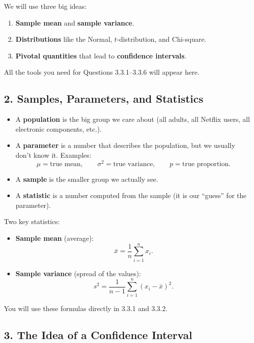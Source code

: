 \documentclass[11pt,letterpaper]{article}
\theoremstyle{remark}
\begin{document}
We will use three big ideas:
\begin{enumerate}
    \item \textbf{Sample mean} and \textbf{sample variance}.
    \item \textbf{Distributions} like the Normal, $t$-distribution, and Chi-square.
    \item \textbf{Pivotal quantities} that lead to \textbf{confidence intervals}.
\end{enumerate}

All the tools you need for Questions 3.3.1--3.3.6 will appear here.

\subsection*{2. Samples, Parameters, and Statistics}

\begin{itemize}
    \item A \textbf{population} is the big group we care about (all adults, all Netflix users, all electronic components, etc.).
    \item A \textbf{parameter} is a number that describes the population, but we usually don't know it. Examples:
    \[
    \mu = \text{true mean}, \qquad \sigma^2 = \text{true variance}, \qquad p = \text{true proportion}.
    \]
    \item A \textbf{sample} is the smaller group we actually see.
    \item A \textbf{statistic} is a number computed from the sample (it is our ``guess'' for the parameter).
\end{itemize}

Two key statistics:

\begin{itemize}
    \item \textbf{Sample mean} (average):
    \[
    \bar{x} = \frac{1}{n}\sum_{i=1}^n x_i.
    \]
    \item \textbf{Sample variance} (spread of the values):
    \[
    s^2 = \frac{1}{n-1}\sum_{i=1}^n (x_i - \bar{x})^2.
    \]
\end{itemize}

You will use these formulas directly in 3.3.1 and 3.3.2.

\subsection*{3. The Idea of a Confidence Interval}
\end{document}

